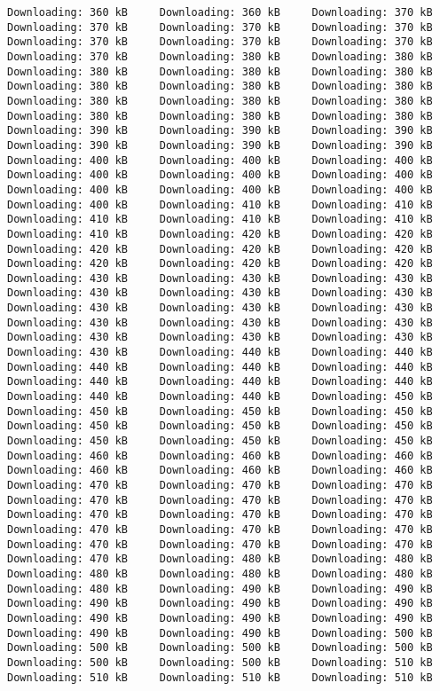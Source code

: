 \documentclass[
  12pt,
  portuguese,
]{report}
\begin{document}
\begin{verbatim}
Downloading: 360 kB     Downloading: 360 kB     Downloading: 370 kB     Downloading: 370 kB     Downloading: 370 kB     Downloading: 370 kB     Downloading: 370 kB     Downloading: 370 kB     Downloading: 370 kB     Downloading: 370 kB     Downloading: 380 kB     Downloading: 380 kB     Downloading: 380 kB     Downloading: 380 kB     Downloading: 380 kB     Downloading: 380 kB     Downloading: 380 kB     Downloading: 380 kB     Downloading: 380 kB     Downloading: 380 kB     Downloading: 380 kB     Downloading: 380 kB     Downloading: 380 kB     Downloading: 380 kB     Downloading: 390 kB     Downloading: 390 kB     Downloading: 390 kB     Downloading: 390 kB     Downloading: 390 kB     Downloading: 390 kB     Downloading: 400 kB     Downloading: 400 kB     Downloading: 400 kB     Downloading: 400 kB     Downloading: 400 kB     Downloading: 400 kB     Downloading: 400 kB     Downloading: 400 kB     Downloading: 400 kB     Downloading: 400 kB     Downloading: 410 kB     Downloading: 410 kB     Downloading: 410 kB     Downloading: 410 kB     Downloading: 410 kB     Downloading: 410 kB     Downloading: 420 kB     Downloading: 420 kB     Downloading: 420 kB     Downloading: 420 kB     Downloading: 420 kB     Downloading: 420 kB     Downloading: 420 kB     Downloading: 420 kB     Downloading: 430 kB     Downloading: 430 kB     Downloading: 430 kB     Downloading: 430 kB     Downloading: 430 kB     Downloading: 430 kB     Downloading: 430 kB     Downloading: 430 kB     Downloading: 430 kB     Downloading: 430 kB     Downloading: 430 kB     Downloading: 430 kB     Downloading: 430 kB     Downloading: 430 kB     Downloading: 430 kB     Downloading: 430 kB     Downloading: 440 kB     Downloading: 440 kB     Downloading: 440 kB     Downloading: 440 kB     Downloading: 440 kB     Downloading: 440 kB     Downloading: 440 kB     Downloading: 440 kB     Downloading: 440 kB     Downloading: 440 kB     Downloading: 450 kB     Downloading: 450 kB     Downloading: 450 kB     Downloading: 450 kB     Downloading: 450 kB     Downloading: 450 kB     Downloading: 450 kB     Downloading: 450 kB     Downloading: 450 kB     Downloading: 450 kB     Downloading: 460 kB     Downloading: 460 kB     Downloading: 460 kB     Downloading: 460 kB     Downloading: 460 kB     Downloading: 460 kB     Downloading: 470 kB     Downloading: 470 kB     Downloading: 470 kB     Downloading: 470 kB     Downloading: 470 kB     Downloading: 470 kB     Downloading: 470 kB     Downloading: 470 kB     Downloading: 470 kB     Downloading: 470 kB     Downloading: 470 kB     Downloading: 470 kB     Downloading: 470 kB     Downloading: 470 kB     Downloading: 470 kB     Downloading: 470 kB     Downloading: 480 kB     Downloading: 480 kB     Downloading: 480 kB     Downloading: 480 kB     Downloading: 480 kB     Downloading: 480 kB     Downloading: 490 kB     Downloading: 490 kB     Downloading: 490 kB     Downloading: 490 kB     Downloading: 490 kB     Downloading: 490 kB     Downloading: 490 kB     Downloading: 490 kB     Downloading: 490 kB     Downloading: 490 kB     Downloading: 500 kB     Downloading: 500 kB     Downloading: 500 kB     Downloading: 500 kB     Downloading: 500 kB     Downloading: 500 kB     Downloading: 510 kB     Downloading: 510 kB     Downloading: 510 kB     Downloading: 510 kB     
\end{verbatim}
\end{document}
